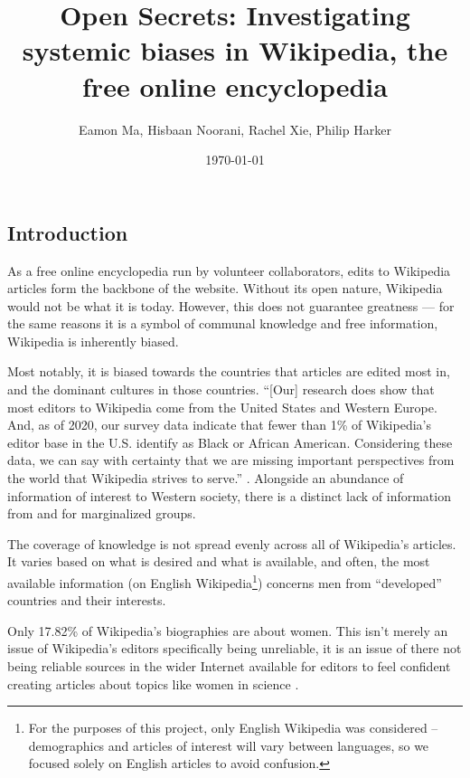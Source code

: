 \documentclass[fontsize=12pt]{article}
\title{Open Secrets: Investigating systemic biases in Wikipedia, the free online encyclopedia}
\author{Eamon Ma, Hisbaan Noorani, Rachel Xie, Philip Harker}
\date{\today}
\begin{document}
\maketitle
\begin{multicols}{2}
    \section{Introduction}
    As a free online encyclopedia run by volunteer collaborators, edits to Wikipedia articles form the backbone of the website.
    Without its open nature, Wikipedia would not be what it is today.
    However, this does not guarantee greatness --- for the same reasons it is a symbol of communal knowledge and free information, Wikipedia is inherently biased.
    
    Most notably, it is biased towards the countries that articles are edited most in, and the dominant cultures in those countries.
    ``[Our] research does show that most editors to Wikipedia come from the United States and Western Europe. And, as of 2020, our survey data indicate that fewer than 1\% of Wikipedia’s editor base in the U.S. identify as Black or African American. Considering these data, we can say with certainty that we are missing important perspectives from the world that Wikipedia strives to serve.'' \parencite{Uzzell}. Alongside an abundance of information of interest to Western society, there is a distinct lack of information from and for marginalized groups.
    
    The coverage of knowledge is not spread evenly across all of Wikipedia's articles. It varies based on what is desired and what is available, and often, the most available information (on English Wikipedia\footnote{For the purposes of this project, only English Wikipedia was considered -- demographics and articles of interest will vary between languages, so we focused solely on English articles to avoid confusion.}) concerns men from ``developed'' countries and their interests.
    
    Only 17.82\% of Wikipedia's biographies are about women.
    This isn't merely an issue of Wikipedia's editors specifically being unreliable, it is an issue of there not being reliable sources in the wider Internet available for editors to feel confident creating articles about topics like women in science \parencite{Erhart}.
    

\end{multicols}
\end{document}
